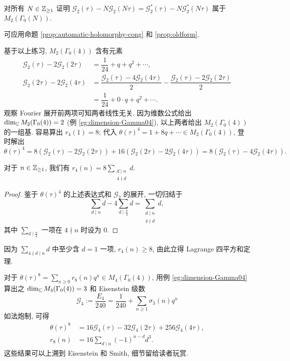 \begin{exercise}
	对所有 $N \in \mathbb{Z}_{\geq 1}$ 证明 $\mathcal{G}_2(\tau) - N\mathcal{G}_2(N\tau) = \mathcal{G}^*_2(\tau) - N\mathcal{G}^*_2(N\tau)$ 属于 $M_2(\Gamma_0(N))$.

	\begin{hint} 可应用命题 \ref{prop:automatic-holomorphy-cong} 和 \ref{prop:oldform}. \end{hint}
\end{exercise}

基于以上练习, $M_2(\Gamma_0(4))$ 含有元素
\begin{align*}
	\mathcal{G}_2(\tau) - 2\mathcal{G}_2(2\tau) & = \dfrac{1}{24} + q + q^2 + \cdots, \\
	\mathcal{G}_2(2\tau) - 2\mathcal{G}_2(4\tau) & = \dfrac{\mathcal{G}_2(\tau) - 4\mathcal{G}_2(4\tau)}{2} - \dfrac{\mathcal{G}_2(\tau) - 2\mathcal{G}_2(2\tau)}{2} \\
	& = \dfrac{1}{24} + 0 \cdot q + q^2 + \cdots. 
\end{align*}
观察 Fourier 展开前两项可知两者线性无关. 因为维数公式给出 $\dim_{\mathbb{C}} M_2(\Gamma_0(4)) = 2$ (例 \ref{eg:dimension-Gamma04}), 以上两者给出 $M_2(\Gamma_0(4))$ 的一组基. 容易算出 $r_4(1)=8$; 代入 $\theta(\tau)^4 = 1 + 8q + \cdots \in M_2(\Gamma_0(4))$, 登时解出
\[ \theta(\tau)^4 = 8 \left( \mathcal{G}_2(\tau) - 2\mathcal{G}_2(2\tau) \right) + 16\left( \mathcal{G}_2(2\tau) - 2\mathcal{G}_2(4\tau) \right) = 8(\mathcal{G}_2(\tau) - 4\mathcal{G}_2(4\tau)). \]

\begin{theorem}[C.\ G.\ J.\ Jacobi]
	对于 $n \in \mathbb{Z}_{\geq 1}$, 我们有 $r_4(n) = 8 \sum_{\substack{d \mid n \\ 4 \nmid d}} d$.
\end{theorem}
\begin{proof}
	鉴于 $\theta(\tau)^4$ 的上述表达式和 $\mathcal{G}_2$ 的展开, 一切归结于
	\[ \sum_{d \mid n} d - 4 \sum_{d \mid \frac{n}{4}} d = \sum_{\substack{d \mid n \\ 4 \nmid d}} d, \]
	其中 $\sum_{d \mid \frac{n}{4}}$ 一项在 $4 \nmid n$ 时设为 $0$.
\end{proof}

因为 $\sum_{4 \nmid d \mid n} d$ 中至少含 $d=1$ 一项, $r_4(n) \geq 8$, 由此立得 Lagrange 四平方和定理.

对于 $\theta(\tau)^8 = \sum_{n \geq 0} r_8(n) q^n \in M_4(\Gamma_0(4))$, 用例 \ref{eg:dimension-Gamma04} 算出之 $\dim_{\mathbb{C}} M_4(\Gamma_0(4)) = 3$ 和 Eisenstein 级数
\[ \mathcal{G}_4 := \frac{E_4}{240} = \frac{1}{240} + \sum_{n \geq 1} \sigma_3(n) q^n \]
如法炮制, 可得
\begin{align*}
	\theta(\tau)^8 & = 16 \mathcal{G}_4(\tau) - 32\mathcal{G}_4(2\tau) + 256\mathcal{G}_4(4\tau), \\
	r_8(n) & = 16 \sum_{d \mid n} (-1)^{n-d} d^3.
\end{align*}
这些结果可以上溯到 Eisenstein 和 Smith, 细节留给读者玩赏.

